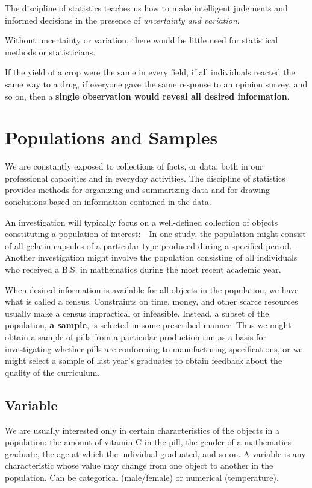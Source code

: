 \documentclass[]{book}
\theoremstyle{definition}
\theoremstyle{definition}
\theoremstyle{definition}
\theoremstyle{remark}
\let\BeginKnitrBlock\begin \let\EndKnitrBlock\end
\begin{document}
The discipline of statistics teaches us how to make intelligent
judgments and informed decisions in the presence of \emph{uncertainty
and variation}.

\BeginKnitrBlock{rmdimportant}
Without uncertainty or variation, there would be little need for
statistical methods or statisticians.
\EndKnitrBlock{rmdimportant}

If the yield of a crop were the same in every field, if all individuals
reacted the same way to a drug, if everyone gave the same response to an
opinion survey, and so on, then a \textbf{single observation would
reveal all desired information}.

\section{Populations and Samples}\label{populations-and-samples}

We are constantly exposed to collections of facts, or data, both in our
professional capacities and in everyday activities. The discipline of
statistics provides methods for organizing and summarizing data and for
drawing conclusions based on information contained in the data.

An investigation will typically focus on a well-defined collection of
objects constituting a population of interest: - In one study, the
population might consist of all gelatin capsules of a particular type
produced during a specified period. - Another investigation might
involve the population consisting of all individuals who received a B.S.
in mathematics during the most recent academic year.

When desired information is available for all objects in the population,
we have what is called a census. Constraints on time, money, and other
scarce resources usually make a census impractical or infeasible.
Instead, a subset of the population, \textbf{a sample}, is selected in
some prescribed manner. Thus we might obtain a sample of pills from a
particular production run as a basis for investigating whether pills are
conforming to manufacturing specifications, or we might select a sample
of last year's graduates to obtain feedback about the quality of the
curriculum.

\subsection{Variable}\label{variable}

We are usually interested only in certain characteristics of the objects
in a population: the amount of vitamin C in the pill, the gender of a
mathematics graduate, the age at which the individual graduated, and so
on. A variable is any characteristic whose value may change from one
object to another in the population. Can be categorical (male/female) or
numerical (temperature).
\end{document}
